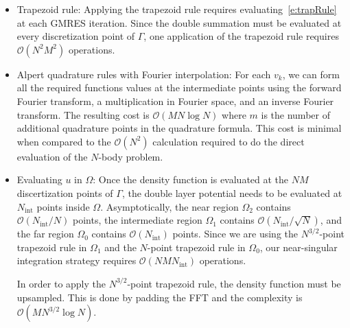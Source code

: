 \documentclass[final]{siamltex}
\newcommand{\bigO} {\mathcal{O}}
\begin{document}
\begin{itemize}

\item{Trapezoid rule:}
Applying the trapezoid rule requires evaluating~\eqref{e:trapRule} at
each GMRES iteration.  Since the double summation must be evaluated at
every discretization point of $\Gamma$, one application of the
trapezoid rule requires $\bigO(N^{2}M^{2})$ operations.


\item{Alpert quadrature rules with Fourier interpolation:}
For each $v_{k}$, we can form all the required functions values at the
intermediate points using the forward Fourier transform, a
multiplication in Fourier space, and an inverse Fourier transform.  The
resulting cost is $\bigO(MN\log N)$ where $m$ is the number of
additional quadrature points in the quadrature formula.  This cost is
minimal when compared to the $\bigO(N^{2})$ calculation required to do
the direct evaluation of the $N$-body problem.

\item{Evaluating $u$ in $\Omega$:}
Once the density function is evaluated at the $NM$ discertization
points of $\Gamma$, the double layer potential needs to be evaluated at
$N_{\mathrm{int}}$ points inside $\Omega$.  Asymptotically, the near
region $\Omega_{2}$ contains $\bigO(N_{\mathrm{int}}/N)$ points, the
intermediate region $\Omega_{1}$ contains
$\bigO(N_{\mathrm{int}}/\sqrt{N})$, and the far region $\Omega_{0}$
contains $\bigO(N_{\mathrm{int}})$ points.  Since we are using the
$N^{3/2}$-point trapezoid rule in $\Omega_{1}$ and the $N$-point
trapezoid rule in $\Omega_{0}$, our near-singular integration strategy
requires $\bigO(NMN_{\mathrm{int}})$ operations.

In order to apply the $N^{3/2}$-point trapezoid rule, the density
function must be upsampled.  This is done by padding the FFT and the
complexity is $\bigO(MN^{3/2} \log N)$.


\end{itemize}






\end{document}
